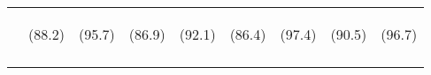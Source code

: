 \begin{center}
\begin{tabular}{lcccccccc}
 & \begin{footnotesize}(88.2)\end{footnotesize} & \begin{footnotesize}(95.7)\end{footnotesize} & \begin{footnotesize}(86.9)\end{footnotesize} & \begin{footnotesize}(92.1)\end{footnotesize} & \begin{footnotesize}(86.4)\end{footnotesize} & \begin{footnotesize}(97.4)\end{footnotesize} & \begin{footnotesize}(90.5)\end{footnotesize} & \begin{footnotesize}(96.7)\end{footnotesize}\\
\noalign{\smallskip}\hline\end{tabular}\\
\end{center}
